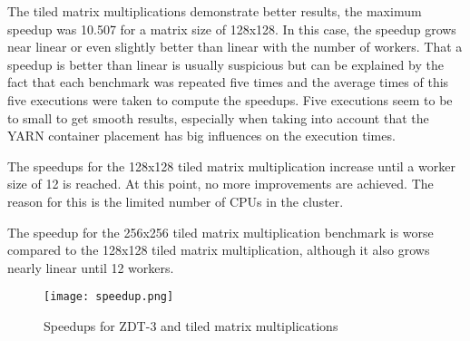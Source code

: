The tiled matrix multiplications demonstrate better results, the maximum speedup was 10.507 for a matrix size of 128x128. In this case, the speedup grows near linear or even slightly better than linear with the number of workers. That a speedup is better than linear is usually suspicious but can be explained by the fact that each benchmark was repeated five times and the average times of this five executions were taken to compute the speedups. Five executions seem to be to small to get smooth results, especially when taking into account that the YARN container placement has big influences on the execution times.

The speedups for the 128x128 tiled matrix multiplication increase until a worker size of 12 is reached. At this point, no more improvements are achieved. The reason for this is the limited number of CPUs in the cluster.

The speedup for the 256x256 tiled matrix multiplication benchmark is worse compared to the 128x128 tiled matrix multiplication, although it also grows nearly linear until 12 workers.

\begin{figure}[ht!]
  \centering
  \texttt{[image: speedup.png]}
  \caption{Speedups for ZDT-3 and tiled matrix multiplications}
  \label{fig:speedup}
\end{figure}

% 
% 
% 


